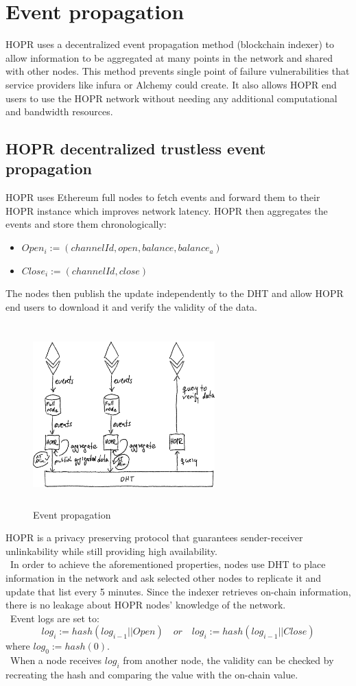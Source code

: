 \section{Event propagation}
HOPR uses a decentralized event propagation method (blockchain indexer) to allow information to be aggregated at many points in the network and shared with other nodes. 
This method prevents single point of failure vulnerabilities that service providers like infura or Alchemy could create. 
It also allows HOPR end users to use the HOPR network without needing any additional computational and bandwidth resources.  
\subsection*{HOPR decentralized trustless event propagation} 
HOPR uses Ethereum full nodes to fetch events and forward them to their HOPR instance which improves network latency.
HOPR then aggregates the events and store them chronologically:
\begin{itemize}
    \item $Open_i:=(channelId, open, balance, balance_a)$
    \item $Close_i:=(channelId, close)$
\end{itemize}
The nodes then publish the update independently to the DHT and allow HOPR end users to download it and verify the validity of the data.
\begin{figure}[H]
    \centering
    \includegraphics[width=7cm,height=7cm,keepaspectratio]{../yellowpaper/images/event_propagation.png}
    \caption{Event propagation}
    \label{fig:Event propagation}
\end{figure}
\hspace{-5mm}HOPR is a privacy preserving protocol that guarantees sender-receiver unlinkability while still providing high availability.
\\~In order to achieve the aforementioned properties, nodes use DHT to place information in the network and ask selected other nodes to replicate it and update that list every 5 minutes. Since the indexer retrieves on-chain information, there is no leakage about HOPR nodes' knowledge of the network. 
\\~Event logs are set to: $$log_i:=hash( log_{i-1}|| Open) \quad or \quad log_i:=hash( log_{i-1}|| Close )$$ where $log_0:=hash(0)$.
\\~When a node receives $log_i$ from another node, the validity can be checked by recreating the hash and comparing the value with the on-chain value.






